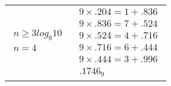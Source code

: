 \documentclass[12pt]{article}
\begin{document}
\begin{enumerate}
\begin{tabular}{l | l}
        $\begin{aligned}
            n \geq 3log_{9}10 \\
            n = 4 \\
        \end{aligned}$

        &

        $\begin{aligned}
            9 \times .204 = 1 + .836 \\
            9 \times .836 = 7 + .524 \\
            9 \times .524 = 4 + .716 \\
            9 \times .716 = 6 + .444 \\
            9 \times .444 = 3 + .996 \\
            \boxed{.1746_{9}}
        \end{aligned}$

     \end{tabular}

\end{enumerate}
\end{document}
